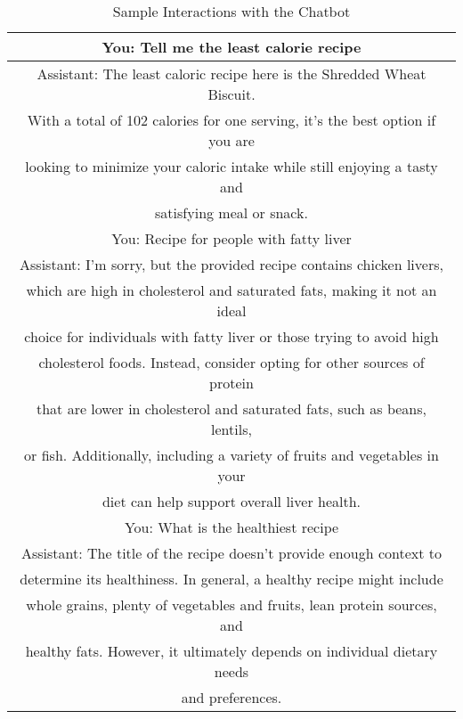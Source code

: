 \documentclass{article}
\begin{document}
\begin{table}[ht]
    \centering
    \caption{Sample Interactions with the Chatbot}
    \label{tab:low_calorie_recipe}
    \begin{tabular}{|c|}
        \hline
        \rowcolor{lightgray} 
        You: Tell me the least calorie recipe \\
        \hline
        Assistant: The least caloric recipe here is the Shredded Wheat Biscuit. \\
        With a total of 102 calories for one serving, it's the best option if you are\\
        looking to minimize your caloric intake while still enjoying a tasty and \\
        satisfying meal or snack. \\
        \hline
        \rowcolor{lightgray} 
        You: Recipe for people with fatty liver \\
        \hline
        Assistant: I'm sorry, but the provided recipe contains chicken livers, \\
        which are high in cholesterol and saturated fats, making it not an ideal\\
        choice for individuals with fatty liver or those trying to avoid high\\
        cholesterol foods. Instead, consider opting for other sources of protein\\
        that are lower in cholesterol and saturated fats, such as beans, lentils,\\
        or fish. Additionally, including a variety of fruits and vegetables in your\\
        diet can help support overall liver health. \\
        \hline
        \rowcolor{lightgray} 
        You: What is the healthiest recipe \\
        \hline
        Assistant: The title of the recipe doesn't provide enough context to\\
        determine its healthiness. In general, a healthy recipe might include\\
        whole grains, plenty of vegetables and fruits, lean protein sources, and\\
        healthy fats. However, it ultimately depends on individual dietary needs\\
        and preferences. \\
        \hline
    \end{tabular}
\end{table}
\end{document}
